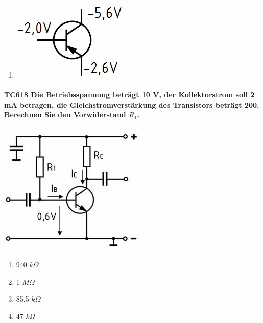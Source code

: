 \documentclass[8pt]{article}
\begin{document}
\begin{enumerate}
\begin{enumerate}[nolistsep,label=\Alph*]
{\begin{enumerate}[nolistsep,label=\Alph*]
\begin{enumerate}[nolistsep,label=\Alph*]
\begin{center}
	\end{center}
\item
	\begin{center}
		\begin{minipage}{\linewidth}
			\centering
			\includegraphics[scale=1.0]{pics/tc617_d.jpg}
		\end{minipage}
	\end{center}
\end{enumerate}

\paragraph*{TC618 Die Betriebsspannung beträgt 10 V, der Kollektorstrom soll 2 mA betragen, die Gleichstromverstärkung des Transistors beträgt 200. Berechnen Sie den Vorwiderstand $R_{1}$.}
\begin{center}
	\begin{minipage}{\linewidth}
		\centering
		\includegraphics[scale=1.0]{pics/tc618_a.jpg}
	\end{minipage}
\end{center}
\begin{enumerate}[nolistsep,label=\Alph*]
\item 940 $k\Omega$
\item 1 $M\Omega$
\item 85,5 $k\Omega$
\item 47 $k\Omega$
\end{enumerate}


\end{enumerate}}
\end{enumerate}
\end{enumerate}
\end{document}
